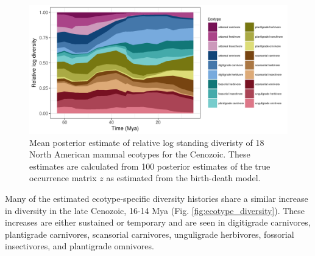 \documentclass[12pt,letterpaper]{article}
\begin{document}
\begin{figure}[ht]
  \centering
  \includegraphics[width=\textwidth,height=0.5\textheight,keepaspectratio=true]{figure/relative_diversity}
  \caption[Relative mammal ecotype log-diversity for the Cenozoic]{Mean posterior estimate of relative log standing diveristy of 18 North American mammal ecotypes for the Cenozoic. These estimates are calculated from 100 posterior estimates of the true occurrence matrix \(z\) as estimated from the birth-death model.}
  \label{fig:ecotype_relative}
\end{figure}


Many of the estimated ecotype-specific diversity histories share a similar increase in diversity in the late Cenozoic, 16-14 Mya (Fig. \ref{fig:ecotype_diversity}). These increases are either sustained or temporary and are seen in digitigrade carnivores, plantigrade carnivores, scansorial carnivores, unguligrade herbivores, fossorial insectivores, and plantigrade omnivores.
\end{document}
